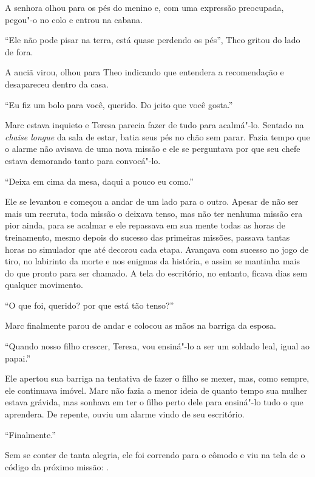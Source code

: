 A senhora olhou para os pés do menino e, com uma expressão preocupada,
pegou"-o no colo e entrou na cabana.

``Ele não pode pisar na terra, está quase perdendo os pés'', Theo gritou
do lado de fora.

A anciã virou, olhou para Theo indicando que entendera a recomendação e
desapareceu dentro da casa.

\asterisc


``Eu fiz um bolo para você, querido. Do jeito que você gosta.''

Marc estava inquieto e Teresa parecia fazer de tudo para acalmá"-lo.
Sentado na \emph{chaise longue} da sala de estar, batia seus pés no chão
sem parar. Fazia tempo que o alarme não avisava de uma nova missão e ele
se perguntava por que seu chefe estava demorando tanto para convocá"-lo.

``Deixa em cima da mesa, daqui a pouco eu como.''

Ele se levantou e começou a andar de um lado para o outro. Apesar de não
ser mais um recruta, toda missão o deixava tenso, mas não ter nenhuma
missão era pior ainda, para se acalmar e ele repassava em sua mente
todas as horas de treinamento, mesmo depois do sucesso das primeiras
missões, passava tantas horas no simulador que até decorou cada etapa.
Avançava com sucesso no jogo de tiro, no labirinto da morte e nos
enigmas da história, e assim se mantinha mais do que pronto para ser
chamado. A tela do escritório, no entanto, ficava dias sem qualquer
movimento.

``O que foi, querido? por que está tão tenso?''

Marc finalmente parou de andar e colocou as mãos na barriga da esposa.

``Quando nosso filho crescer, Teresa, vou ensiná"-lo a ser um soldado
leal, igual ao papai.''

Ele apertou sua barriga na tentativa de fazer o filho se mexer, mas,
como sempre, ele continuava imóvel. Marc não fazia a menor ideia de
quanto tempo sua mulher estava grávida, mas sonhava em ter o filho perto
dele para ensiná"-lo tudo o que aprendera. De repente, ouviu um alarme
vindo de seu escritório.

``Finalmente.''

Sem se conter de tanta alegria, ele foi correndo para o cômodo e viu na
tela de  o código da próximo missão: .

